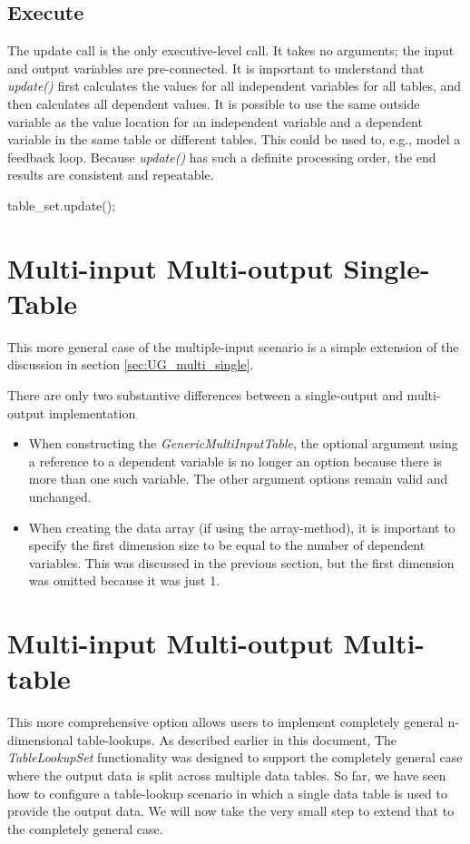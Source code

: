 \documentclass[11pt,fleqn]{report}
\begin{document}
\subsection{Execute}
The update call is the only executive-level call.  It takes no arguments; the
 input and output variables are pre-connected. It is important to
understand that \textit{update()} first calculates the values for all
independent variables for all tables, and then calculates all dependent
values. It is possible to use the same outside variable as the value
location for an independent variable and a dependent variable in the same
table or different tables. This could be used to, e.g., model a feedback
loop.  Because \textit{update()} has such a definite processing order, the
end results are consistent and repeatable.

\begin{code}
table_set.update();
\end{code}

\section{Multi-input Multi-output Single-Table} \label{sec:UG_multi_multi}
This more general case of the multiple-input scenario is a simple extension
of the discussion in section \ref{sec:UG_multi_single}.

There are only two substantive differences between a single-output
 and multi-output implementation
\begin{itemize}
 \item When constructing the \textit{GenericMultiInputTable}, the optional
 argument using a reference to a dependent variable is no longer an option
 because there is more than one such variable.  The other argument
 options remain valid and unchanged.
 \item When creating the data array (if using the array-method), it is
 important to specify the first dimension size to be equal to the
 number of dependent variables.
 This was discussed in the previous section, but the first dimension was
 omitted because it was just 1.
\end{itemize}

\section{Multi-input Multi-output Multi-table} \label{sec:UG_multi_multi_multi}

This more comprehensive option allows users to implement completely
 general n-dimensional table-lookups.
As described earlier in this document, The \textit{TableLookupSet}
 functionality was designed to support the completely general case where
the output data is split across multiple data tables.
So far, we have seen how to configure a table-lookup scenario in which
a single data table is used to provide the output data.  We will now
 take the very small step to extend that to the completely general case.
\end{document}
